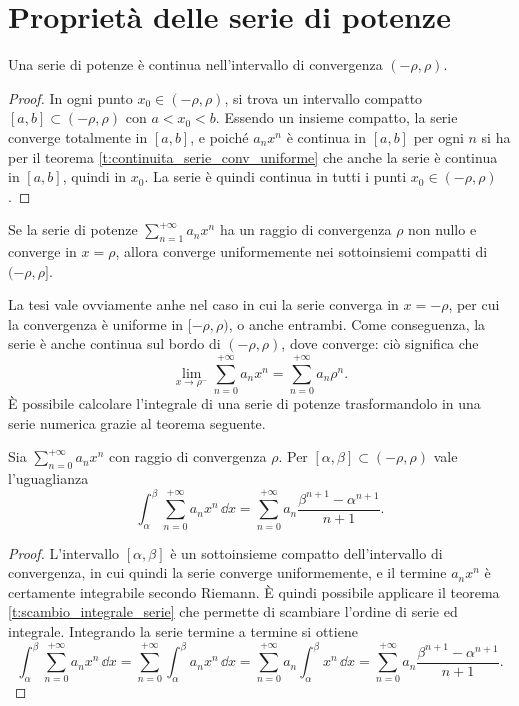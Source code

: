 \section{Proprietà delle serie di potenze}
\begin{teorema}
Una serie di potenze è continua nell'intervallo di convergenza $(-\rho,\rho)$.
\end{teorema}
\begin{proof}
In ogni punto $x_0\in(-\rho,\rho)$, si trova un intervallo compatto $[a,b]\subset(-\rho,\rho)$ con $a<x_0<b$. Essendo un insieme compatto, la serie converge totalmente in $[a,b]$, e poiché $a_nx^n$ è continua in $[a,b]$ per ogni $n$ si ha per il teorema \ref{t:continuita_serie_conv_uniforme} che anche la serie è continua in $[a,b]$, quindi in $x_0$.
La serie è quindi continua in tutti i punti $x_0\in(-\rho,\rho)$. 
\end{proof}
\begin{teorema}[Abel]
Se la serie di potenze $\sum_{n=1}^{+\infty}a_nx^n$ ha un raggio di convergenza $\rho$ non nullo e converge in $x=\rho$, allora converge uniformemente nei sottoinsiemi compatti di $(-\rho,\rho]$.
\end{teorema}
La tesi vale ovviamente anhe nel caso in cui la serie converga in $x=-\rho$, per cui la convergenza è uniforme in $[-\rho,\rho)$, o anche entrambi.
Come conseguenza, la serie è anche continua sul bordo di $(-\rho,\rho)$, dove converge: ciò significa che
\[
\lim_{x\to\rho^-}\sum_{n=0}^{+\infty}a_nx^n=\sum_{n=0}^{+\infty}a_n\rho^n.
\]
È possibile calcolare l'integrale di una serie di potenze trasformandolo in una serie numerica grazie al teorema seguente.
\begin{teorema} \label{t:integrale-serie-potenze}
	Sia $\sum_{n=0}^{+\infty}a_nx^n$ con raggio di convergenza $\rho$.
	Per $[\alpha,\beta]\subset(-\rho,\rho)$ vale l'uguaglianza
	\begin{equation}
		\int_\alpha^\beta\sum_{n=0}^{+\infty}a_nx^n\,\dd x=\sum_{n=0}^{+\infty}a_n\frac{\beta^{n+1}-\alpha^{n+1}}{n+1}.
	\end{equation}
\end{teorema}
\begin{proof}
	L'intervallo $[\alpha,\beta]$ è un sottoinsieme compatto dell'intervallo di convergenza, in cui quindi la serie converge uniformemente, e il termine $a_nx^n$ è certamente integrabile secondo Riemann.
	È quindi possibile applicare il teorema \ref{t:scambio_integrale_serie} che permette di scambiare l'ordine di serie ed integrale.
	Integrando la serie termine a termine si ottiene
	\begin{equation}
		\int_\alpha^\beta\sum_{n=0}^{+\infty}a_nx^n\,\dd x=\sum_{n=0}^{+\infty}\int_\alpha^\beta a_nx^n\,\dd x=\sum_{n=0}^{+\infty}a_n\int_\alpha^\beta x^n\,\dd x=\sum_{n=0}^{+\infty}a_n\frac{\beta^{n+1}-\alpha^{n+1}}{n+1}.
	\end{equation}
\end{proof}

